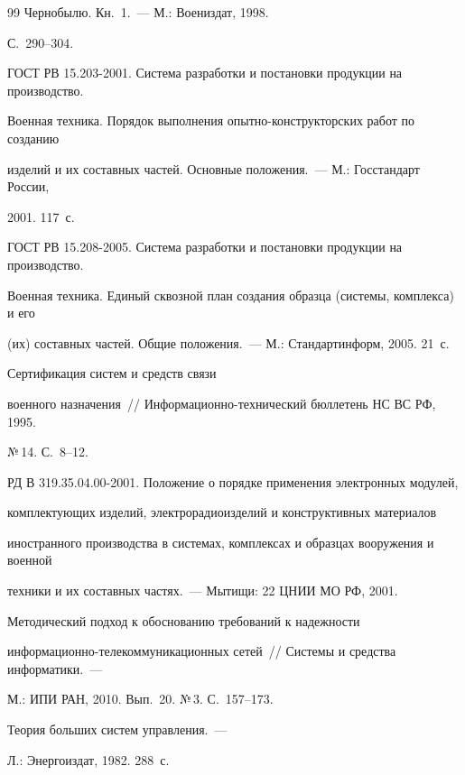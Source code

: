 {{\begin{thebibliography}{99}
Чернобылю. Кн.~1.~--- М.: Воениздат, 1998. 


С.~290--304.




ГОСТ РВ 15.203-2001. Система разработки и постановки продукции на производство. 


Военная техника. Порядок выполнения опытно-конструкторских работ по созданию 


изделий и их составных частей. Основные положения.~--- М.: Госстандарт России, 


2001. 117~с.




ГОСТ РВ 15.208-2005. Система разработки и постановки продукции на производство. 


Военная техника. Единый сквозной план создания образца (системы, комплекса) и его 


(их) составных частей. Общие положения.~--- М.: Стандартинформ, 2005. 21~с.







 Сертификация систем и средств связи 


военного назначения~/\!\!/ Информационно-технический бюллетень НС ВС РФ, 1995. 


№\,14. С.~8--12.







РД В 319.35.04.00-2001. Положение о порядке применения электронных модулей, 


комплектующих изделий, электрорадиоизделий и конструктивных материалов 


иностранного производства в системах, комплексах и образцах вооружения и военной 


техники и их составных частях.~--- Мытищи: 22 ЦНИИ МО РФ, 2001.









Методический подход к обоснованию требований к надежности 


информационно-телекоммуникационных сетей~/\!\!/ Системы и средства информатики.~--- 


М.: ИПИ РАН, 2010. Вып.~20. №\,3. С.~157--173.




 Теория больших систем управления.~--- 


Л.: Энергоиздат, 1982. 288~с.





 \end{thebibliography}


}


}





